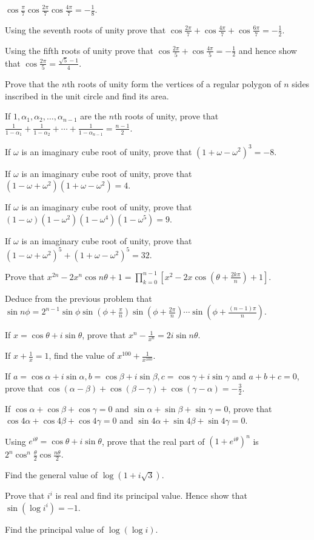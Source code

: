   $\cos\frac{\pi}{7}\cos\frac{2\pi}{7}\cos\frac{4\pi}{7} = -\frac{1}{8}$.
\item Using the seventh roots of unity prove that $\cos\frac{2\pi}{7} + \cos\frac{4\pi}{7} +
  \cos\frac{6\pi}{7} = -\frac{1}{2}$.
\item Using the fifth roots of unity prove that $\cos\frac{2\pi}{5} + \cos\frac{4\pi}{5} = -\frac{1}{2}$ and
  hence show that $\cos\frac{2\pi}{5} = \frac{\sqrt{5} - 1}{4}$.
\item Prove that the $n$th roots of unity form the vertices of a regular polygon of $n$ sides inscribed in the
  unit circle and find its area.
\item If $1, \alpha_1, \alpha_2, \ldots, \alpha_{n - 1}$ are the $n$th roots of unity, prove that
  $\frac{1}{1 - \alpha_1} + \frac{1}{1 - \alpha_2} + \cdots + \frac{1}{1 - \alpha_{n - 1}} = \frac{n -
    1}{2}$.
\item If $\omega$ is an imaginary cube root of unity, prove that $(1 + \omega - \omega^2)^3 = -8$.
\item If $\omega$ is an imaginary cube root of unity, prove that $(1 - \omega + \omega^2)(1 + \omega -
  \omega^2) = 4$.
\item If $\omega$ is an imaginary cube root of unity, prove that $(1 - \omega)(1 - \omega^2)(1 - \omega^4)(1 -
  \omega^5) = 9$.
\item If $\omega$ is an imaginary cube root of unity, prove that $(1 - \omega + \omega^2)^5 + (1 + \omega -
  \omega^2)^5 = 32$.
\item Prove that $x^{2n} - 2x^n\cos n\theta + 1 = \prod_{k = 0}^{n - 1}\left[x^2 - 2x\cos\left(\theta +
    \frac{2k\pi}{n}\right) + 1\right]$.
\item Deduce from the previous problem that $\sin n\phi = 2^{n - 1}\sin\phi\sin\left(\phi +
  \frac{\pi}{n}\right)\sin\left(\phi + \frac{2\pi}{n}\right)\cdots\sin\left(\phi + \frac{(n -
    1)\pi}{n}\right)$.
\item If $x = \cos\theta + i\sin\theta$, prove that $x^n - \frac{1}{x^n} = 2i\sin n\theta$.
\item If $x + \frac{1}{x} = 1$, find the value of $x^{100} + \frac{1}{x^{100}}$.
\item If $a = \cos\alpha + i\sin\alpha, b = \cos\beta + i\sin\beta, c = \cos\gamma + i\sin\gamma$ and $a + b
  + c = 0$, prove that $\cos(\alpha - \beta) + \cos(\beta - \gamma) + \cos(\gamma - \alpha) = -\frac{3}{2}$.
\item If $\cos\alpha + \cos\beta + \cos\gamma  = 0$ and $\sin\alpha + \sin\beta + \sin\gamma = 0$, prove
  that $\cos4\alpha + \cos4\beta + \cos4\gamma = 0$ and $\sin4\alpha + \sin4\beta + \sin4\gamma = 0$.
\item Using $e^{i\theta} = \cos\theta + i\sin\theta$, prove that the real part of $\left(1 +
  e^{i\theta}\right)^n$ is $2^n\cos^n\frac{\theta}{2}\cos\frac{n\theta}{2}$.
\item Find the general value of $\log(1 + i\sqrt{3})$.
\item Prove that $i^i$ is real and find its principal value. Hence show that $\sin\left(\log i^i\right) = -1$.
\item Find the principal value of $\log(\log i)$.
\stopitemize
